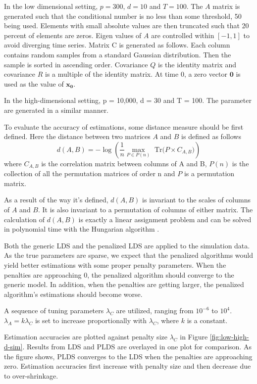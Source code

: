 \documentclass[fleqn]{article}
\let\oldref\ref
\renewcommand{\ref}[1]{(\oldref{#1})}
\begin{document}
In the low dimensional setting, $p = 300$, $d = 10$ and $T = 100$. The $A$ matrix is generated such that the conditional number is no less than some threshold, 50 being used. Elements with small absolute values are then truncated such that 20 percent of elements are zeros. Eigen values of $A$ are controlled within $[-1,1]$ to avoid diverging time series. Matrix C is generated as follows. Each column contains random samples from a standard Gaussian distribution. Then the sample is sorted in ascending order. Covariance $Q$ is the identity matrix and covariance $R$ is a multiple of the identity matrix. At time 0, a zero vector $\mathbf{0}$ is used as the value of $\mathbf{x_0}$.

In the high-dimensional setting, p = 10,000, d = 30 and T = 100. The parameter are generated in a similar manner.

To evaluate the accuracy of estimations, some distance measure should be first defined. Here the distance between two matrices $A$ and $B$ is defined as follows
\begin{equation*}
d( A,B) = -\log(\frac{1}{n}\max_{P\in P(n)} \text{ Tr}\bigl(P\times C_{A,B}\bigr))
\end{equation*}
where $C_{A,B}$ is the correlation matrix between columns of A and B, $P(n)$ is the collection of all the permutation matrices of order n and $P$ is a permutation matrix.

As a result of the way it's defined, $d(A,B)$ is invariant to the scales of columns of $A$ and $B$. It is also invariant to a permutation of columns of either matrix. The calculation of $d(A,B)$ is exactly a linear assignment problem and can be solved in polynomial time with the Hungarian algorithm \cite{kuhn1955hungarian}.


Both the generic LDS and the penalized LDS are applied to the simulation data. As the true parameters are sparse, we expect that the penalized algorithms would yield better estimations with some proper penalty parameters. When the penalties are approaching 0, the penalized algorithm should converge to the generic model. In addition, when the penalties are getting larger, the penalized algorithm's estimations should become worse.

A sequence of tuning parameters $\lambda_C$ are utilized, ranging from $10^{-6}$ to $10^4$. $\lambda_A = k \lambda_C$ is set to increase proportionally with $\lambda_C$, where $k$ is a constant.

Estimation accuracies are plotted against penalty size $\lambda_C$ in Figure \oldref{fig:low-high-d-sim}. Results from LDS and PLDS are overlayed in one plot for comparison. As the figure shows, PLDS converges to the LDS when the penalties are approaching zero. Estimation accuracies first increase with penalty size and then decrease due to over-shrinkage.
\end{document}
